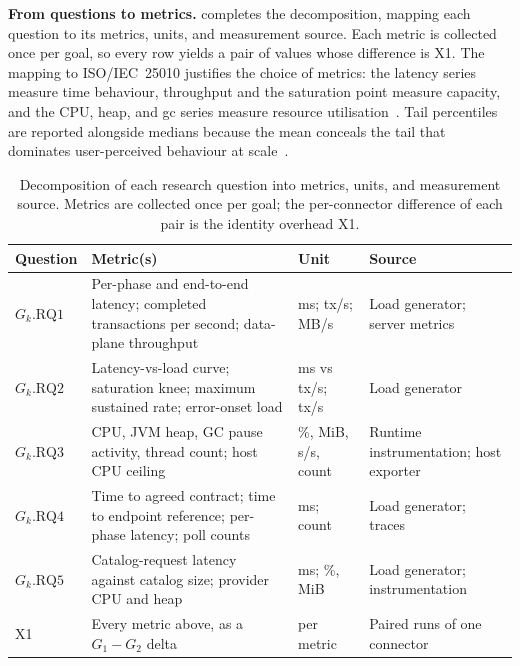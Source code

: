 \textbf{From questions to metrics.}  completes the decomposition, mapping each question to its metrics, units, and measurement source. Each metric is collected once per goal, so every row yields a pair of values whose difference is X1. The mapping to ISO/IEC~25010 justifies the choice of metrics: the latency series measure time behaviour, throughput and the saturation point measure capacity, and the CPU, heap, and \gls{gc} series measure resource utilisation~\citep{iso25010}. Tail percentiles are reported alongside medians because the mean conceals the tail that dominates user-perceived behaviour at scale~\citep{dean2013tail}.

\begin{table}[H]
    \centering
    \small
    \setlength{\tabcolsep}{5pt}
    \begin{tabularx}{\textwidth}{@{}l X l >{\raggedright\arraybackslash}p{2.7cm}@{}}
        \toprule
        \textbf{Question} & \textbf{Metric(s)} & \textbf{Unit} & \textbf{Source} \\
        \midrule
        $G_k.\text{RQ}1$ & Per-phase and end-to-end latency; completed transactions per second; data-plane throughput & ms; tx/s; MB/s & Load generator; server metrics \\
        $G_k.\text{RQ}2$ & Latency-vs-load curve; saturation knee; maximum sustained rate; error-onset load & ms vs tx/s; tx/s & Load generator \\
        $G_k.\text{RQ}3$ & CPU, JVM heap, GC pause activity, thread count; host CPU ceiling & \%, MiB, s/s, count & Runtime instrumentation; host exporter \\
        $G_k.\text{RQ}4$ & Time to agreed contract; time to endpoint reference; per-phase latency; poll counts & ms; count & Load generator; traces \\
        $G_k.\text{RQ}5$ & Catalog-request latency against catalog size; provider CPU and heap & ms; \%, MiB & Load generator; instrumentation \\
        X1 & Every metric above, as a $G_1 - G_2$ delta & per metric & Paired runs of one connector \\
        \bottomrule
    \end{tabularx}
    \caption[GQM tree: questions to metrics]{Decomposition of each research question into metrics, units, and measurement source. Metrics are collected once per goal; the per-connector difference of each pair is the identity overhead X1.}
    \label{tab:gqm-tree}
\end{table}


